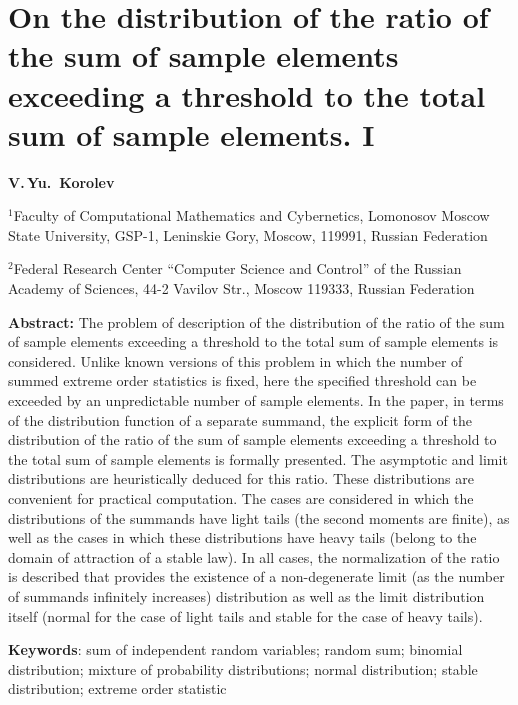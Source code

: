 \documentclass[14pt,a4paper]{extarticle}
\begin{document}
\section*{On the distribution of the ratio of the sum of sample elements exceeding a threshold to the total sum of sample elements. I}

\large{\bfseries V.\,Yu.~Korolev}
\bigskip

\small


$^1$Faculty of Computational Mathematics and Cybernetics, Lomonosov Moscow
State University, GSP-1, Leninskie Gory, Moscow, 119991, Russian Federation

$^2$Federal Research Center ``Computer Science and Control'' of the Russian Academy of Sciences, 44-2 Vavilov Str., Moscow 119333, Russian Federation


\bigskip

\bigskip

{\bf Abstract:} The problem of description of the distribution of the ratio of the sum of sample elements exceeding a threshold to the total sum of sample elements is considered. Unlike known versions of this problem in which the number of summed extreme order statistics is fixed, here the specified threshold can be exceeded by an unpredictable number of sample elements. In the paper, in terms of the distribution function of a separate summand, the explicit form of the distribution of the ratio of the sum of sample elements exceeding a threshold to the total sum of sample elements is formally presented. The asymptotic and limit distributions are heuristically deduced for this ratio. These distributions are convenient for practical computation. The cases are considered in which the distributions of the summands have light tails (the second moments are finite), as well as the cases in which these distributions have heavy tails (belong to the domain of attraction of a stable law). In all cases, the normalization of the ratio is described that provides the existence of a non-degenerate limit (as the number of summands infinitely increases) distribution as well as the limit distribution itself (normal for the case of light tails and stable for the case of heavy tails).



\medskip

{\bf Keywords}: sum of independent random variables; random sum; binomial distribution; mixture of probability distributions; normal distribution; stable distribution; extreme order statistic
\end{document}
